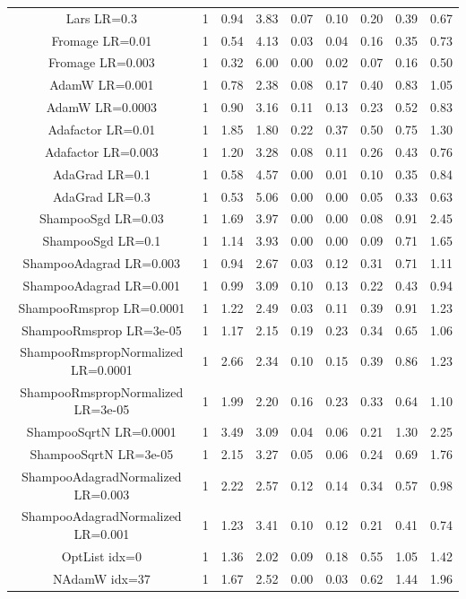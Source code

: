 \begin{tabular}{||c c c c c c c c c||}
Lars LR=0.3 & 1 &0.94 & 3.83 & 0.07 & 0.10 & 0.20 & 0.39 & 0.67 \\
Fromage LR=0.01 & 1 &0.54 & 4.13 & 0.03 & 0.04 & 0.16 & 0.35 & 0.73 \\
Fromage LR=0.003 & 1 &0.32 & 6.00 & 0.00 & 0.02 & 0.07 & 0.16 & 0.50 \\
AdamW LR=0.001 & 1 &0.78 & 2.38 & 0.08 & 0.17 & 0.40 & 0.83 & 1.05 \\
AdamW LR=0.0003 & 1 &0.90 & 3.16 & 0.11 & 0.13 & 0.23 & 0.52 & 0.83 \\
Adafactor LR=0.01 & 1 &1.85 & 1.80 & 0.22 & 0.37 & 0.50 & 0.75 & 1.30 \\
Adafactor LR=0.003 & 1 &1.20 & 3.28 & 0.08 & 0.11 & 0.26 & 0.43 & 0.76 \\
AdaGrad LR=0.1 & 1 &0.58 & 4.57 & 0.00 & 0.01 & 0.10 & 0.35 & 0.84 \\
AdaGrad LR=0.3 & 1 &0.53 & 5.06 & 0.00 & 0.00 & 0.05 & 0.33 & 0.63 \\
ShampooSgd LR=0.03 & 1 &1.69 & 3.97 & 0.00 & 0.00 & 0.08 & 0.91 & 2.45 \\
ShampooSgd LR=0.1 & 1 &1.14 & 3.93 & 0.00 & 0.00 & 0.09 & 0.71 & 1.65 \\
ShampooAdagrad LR=0.003 & 1 &0.94 & 2.67 & 0.03 & 0.12 & 0.31 & 0.71 & 1.11 \\
ShampooAdagrad LR=0.001 & 1 &0.99 & 3.09 & 0.10 & 0.13 & 0.22 & 0.43 & 0.94 \\
ShampooRmsprop LR=0.0001 & 1 &1.22 & 2.49 & 0.03 & 0.11 & 0.39 & 0.91 & 1.23 \\
ShampooRmsprop LR=3e-05 & 1 &1.17 & 2.15 & 0.19 & 0.23 & 0.34 & 0.65 & 1.06 \\
ShampooRmspropNormalized LR=0.0001 & 1 &2.66 & 2.34 & 0.10 & 0.15 & 0.39 & 0.86 & 1.23 \\
ShampooRmspropNormalized LR=3e-05 & 1 &1.99 & 2.20 & 0.16 & 0.23 & 0.33 & 0.64 & 1.10 \\
ShampooSqrtN LR=0.0001 & 1 &3.49 & 3.09 & 0.04 & 0.06 & 0.21 & 1.30 & 2.25 \\
ShampooSqrtN LR=3e-05 & 1 &2.15 & 3.27 & 0.05 & 0.06 & 0.24 & 0.69 & 1.76 \\
ShampooAdagradNormalized LR=0.003 & 1 &2.22 & 2.57 & 0.12 & 0.14 & 0.34 & 0.57 & 0.98 \\
ShampooAdagradNormalized LR=0.001 & 1 &1.23 & 3.41 & 0.10 & 0.12 & 0.21 & 0.41 & 0.74 \\
\hline
OptList idx=0 & 1 &1.36 & 2.02 & 0.09 & 0.18 & 0.55 & 1.05 & 1.42 \\
NAdamW idx=37 & 1 &1.67 & 2.52 & 0.00 & 0.03 & 0.62 & 1.44 & 1.96 \\

\end{tabular}
